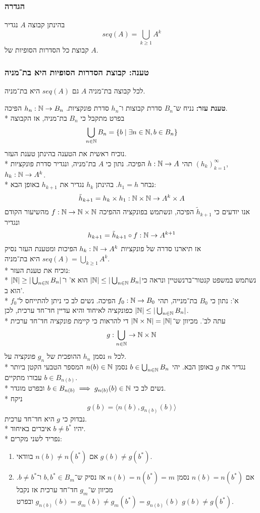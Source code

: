\subsubsection{הגדרה}
בהינתן קבוצה $A$ נגדיר 
\[
	seq(A) = \bigcup_{k \ge 1} A^k
\]
קבוצת כל הסדרות הסופיות של $A$.

\subsubsection{טענה: קבוצת הסדרות הסופיות היא בת־מניה}
לכל קבוצה בת־מניה $A$ גם $seq(A)$ היא בת־מניה.

\textbf{טענת עזר:} נניח ש־$B_n$ סדרת קבוצות ו־$h_n$ סדרת פונקציות. $h_n : \mathbb{N} \to B_n$ הפיכה.\\*
בפרט מתקבל כי $B_n$ בת־מניה, אז הקבוצה
\[
	\bigcup_{n \in \mathbb{N}} B_n = \{ b \mid \exists n \in \mathbb{N}, b \in B_n \}
\]
נוכיח ראשית את הטענה בהינתן טענת העזר. \\*
תהי $h : \mathbb{N} \to A$ הפיכה.
נתון כי $A$ בת־מניה, ונגדיר סדרת פונקציות ${(h_k)}_{k = 1}^\infty$, $h_k : \mathbb{N} \to A^k$. \\*
נבחר $h_1 = h$. בהינתן $h_k$ נגדיר את $h_{k + 1}$ באופן הבא:
\[
	\tilde{h}_{k + 1} = h_k \times h_1 : \mathbb{N} \times \mathbb{N} \to A^k \times A
\]
אנו יודעים כי $\tilde{h}_{k + 1}$ הפיכה, ונשתמש בפונקציה ההפיכה $f : \mathbb{N} \to \mathbb{N} \times \mathbb{N}$ מהשיעור הקודם ונגדיר
\[
	h_{k + 1} = \tilde{h}_{k + 1} \circ f : \mathbb{N} \to A^{k + 1}
\]
אז תיארנו סדרה של פונקציות $h_k : \mathbb{N} \to A^k$ הפיכות ומטענת העזר נסיק $seq(A) = \bigcup_{k \ge 1} A^k$ היא בת־מניה. \\*
נוכיח את טענת העזר: \\*
נשתמש במשפט קנטור־ברנשטיין ונראה כי$|\mathbb{N}| \le | \bigcup_{n \in \mathbb{N}}B_n|$ הוא א' ו־$|\mathbb{N}| \ge | \bigcup_{n \in \mathbb{N}}B_n|$ הוא ב'. \\*
א': נתון כי $B_0$ בת־מנייה, תהי $f_0 : \mathbb{N} \to B_0$ הפיכה. נשים לב כי ניתן להתייחס ל־$f_0$ כפונקציה לאיחוד והיא עדיין חד־חד ערכית, לכן $|\mathbb{N}| \le | \bigcup_{n \in \mathbb{N}}B_n|$. \\*
עתה לב'. מכיוון ש־$|\mathbb{N} \times \mathbb{N}| = |\mathbb{N}|$ די להראות כי קיימת פונקציה חד־חד ערכית
\[
	g : \bigcup_{n \in \mathbb{N}} \to \mathbb{N} \times \mathbb{N}
\]
לכל $n$ נסמן $h_n$ ההופכית של $g_n$ פונקציה על. \\*
נגדיר את $g$ באופן הבא. יהי $b \in \bigcup_{n \in \mathbb{N}} B_n$ נסמן $n(b) \in \mathbb{N}$ המספר הטבעי הקטן ביותר עבורו מתקיים $b \in B_{n(b)}$. \\*
נשים לב כי $b \in B_{n(b)} \implies g_{n(b)}(b) \in \mathbb{N}$ ובפרט מוגדר. \\*
ניקח
\[
	g(b) = \langle n(b), g_{n(b)}(b) \rangle
\]
נבדוק כי $g$ היא חד־חד ערכית. \\*
יהיו $b \ne b^*$ איברים באיחוד. \\*
נפריד לשני מקרים:
\begin{enumerate}
	\item אם $n(b) \ne n(b^*)$ בוודאי $g(b) \ne g(b^*)$.
	\item אם $n(b) = n(b^*)$ נסמן $n(b) = n(b^*) = m$ אז נסיק ש־$b, b^* \in B_m$ ו־$b \ne b^*$. מכיוון ש־$g_m$ חד־חד ערכית אז נקבל $g_{n(b)}(b) = g_m(b) \ne g_m(b^*) = g_{n(b)}(b)$ ובפרט $g(b) \ne g(b^*)$.
\end{enumerate}

